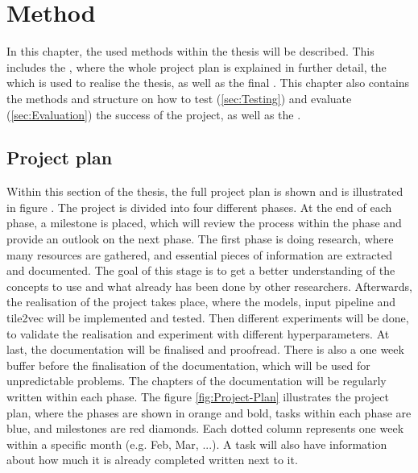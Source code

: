 \chapter{Method}
\label{ch:Method}

In this chapter, the used methods within the thesis will be described. This includes the , where the whole project plan is explained in further detail, the  which is used to realise the thesis, as well as the final . This chapter also contains the methods and structure on how to test (\ref{sec:Testing}) and evaluate (\ref{sec:Evaluation}) the success of the project, as well as the .

\section{Project plan}
\label{sec:Project-Plan}

Within this section of the thesis, the full project plan is shown and is illustrated in figure . The project is divided into four different phases. At the end of each phase, a milestone is placed, which will review the process within the phase and provide an outlook on the next phase. The first phase is doing research, where many resources are gathered, and essential pieces of information are extracted and documented. The goal of this stage is to get a better understanding of the concepts to use and what already has been done by other researchers. Afterwards, the realisation of the project takes place, where the models, input pipeline and tile2vec will be implemented and tested. Then different experiments will be done, to validate the realisation and experiment with different hyperparameters. At last, the documentation will be finalised and proofread. There is also a one week buffer before the finalisation of the documentation, which will be used for unpredictable problems. The chapters of the documentation will be regularly written within each phase.
\newline
\newline
The figure \ref{fig:Project-Plan} illustrates the project plan, where the phases are shown in orange and bold, tasks within each phase are blue, and milestones are red diamonds. Each dotted column represents one week within a specific month (e.g. Feb, Mar, ...). A task will also have information about how much it is already completed written next to it.

